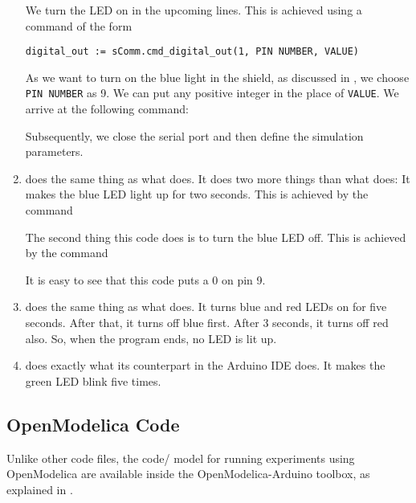 \begin{enumerate}
        We turn the LED on in the upcoming lines.  This is achieved using a
        command of the form
        \begin{lstlisting}[style=nonumbers]
          digital_out := sComm.cmd_digital_out(1, PIN NUMBER, VALUE)
  \end{lstlisting}
        As we want to turn on the blue light in the shield, as discussed in
        , we choose {\tt PIN NUMBER} as 9.  We can put
        any positive integer in the place of {\tt VALUE}.  We arrive at the
        following command:
        
        Subsequently, we close the serial port and then define the simulation parameters. 
  \item {} does the same thing as what
         does.  It does two more things than what
         does: It makes the blue LED light up for two
        seconds.  This is achieved by the command
        
        The second thing this code does is to turn the blue LED off.  This
        is achieved by the command
        
        It is easy to see that this code puts a 0 on pin 9.
        
  \item {} does the same thing as what
         does.  It turns blue and red LEDs on for
        five seconds.  After that, it turns off blue first.  After 3
        seconds, it turns off red also.  So, when the program ends, no LED is
        lit up.
        
  \item {} does exactly what its counterpart
        in the Arduino IDE does.  It makes the green LED blink five times.
  \end{enumerate}

\subsection{OpenModelica Code}
Unlike other code files, the code/ model for running experiments using OpenModelica are 
available inside the OpenModelica-Arduino toolbox, as explained in .
\lstset{style=mystyle}
\label{sec:led-OpenModelica-code}

